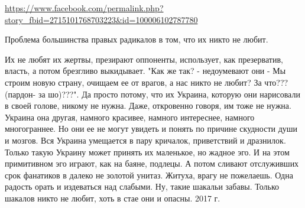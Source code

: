  
 
 
 
 

\url{https://www.facebook.com/permalink.php?story_fbid=2715101768703223&id=100006102787780}

Проблема большинства правых радикалов в том, что их никто не любит.

Их не любят их жертвы, презирают оппоненты, использует, как презерватив, власть, а потом брезгливо выкидывает.
"Как же так? - недоумевают они - Мы строим новую страну, очищаем ее от врагов, а нас никто не любит? За что??? (пардон- за шо)???".
Да просто потому, что их Украина, которую они нарисовали в своей голове, никому не нужна.
Даже, откровенно говоря, им тоже не нужна.
Украина она другая, намного красивее, намного интереснее, намного многограннее.
Но они ее не могут увидеть и понять по причине скудности души и мозгов. Вся Украина умещается в пару кричалок, приветствий и дразнилок. Только такую Украину может принять их маленькое, но жадное эго.
И на этом примитивном эго играют, как на баяне, подлецы.
А потом сливают отслуживших срок фанатиков в далеко не золотой унитаз.
Житуха, врагу не пожелаешь. Одна радость орать и издеваться над слабыми. Ну, такие шакальи забавы.
Только шакалов никто не любит, хоть в стае они и опасны.
2017 г.
